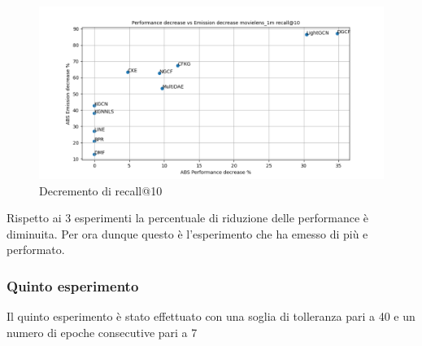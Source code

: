 \begin{figure}[H]
    \centering
    \includegraphics[scale=0.5]{images/decrement_recall@10_movielens_1m_30_6.png}
    \caption{Decremento di recall@10}
\end{figure}

\noindent Rispetto ai 3 esperimenti la percentuale di riduzione delle performance è diminuita. Per ora dunque questo è l'esperimento che ha emesso di più e performato.

\subsubsection{Quinto esperimento}

Il quinto esperimento è stato effettuato con una soglia di tolleranza pari a 40 e un numero di epoche consecutive pari a 7


